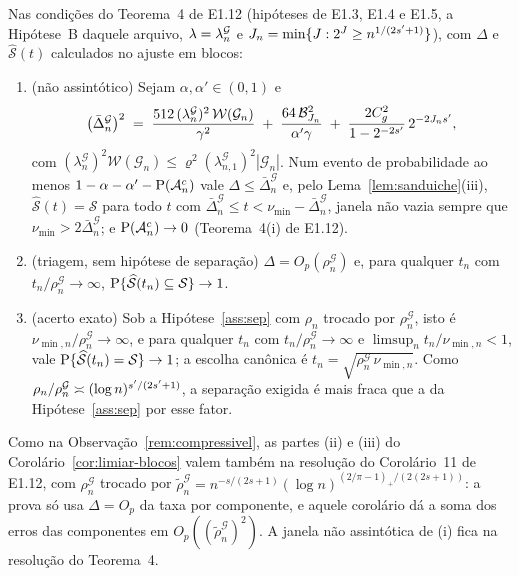 \documentclass[11pt,a4paper]{article}
\newcommand{\Shat}{\widehat{\mathcal{S}}}
\newcommand{\sepmin}{\nu_{\min}}
\newcommand{\sepminn}{\nu_{\min,n}}
\newcommand{\rn}{\rho}
\newcommand{\Gcal}{\mathcal{G}}
\newcommand{\lamG}{\lambda^{\mathcal{G}}_{n}}
\newcommand{\lamGone}{\lambda^{\mathcal{G}}_{n,1}}
\newcommand{\rhoG}{\rho^{\mathcal{G}}_{n}}
\newcommand{\rhoGt}{\tilde{\rho}^{\mathcal{G}}_{n}}
\newcommand{\Acal}{\mathcal{A}_{n}}
\begin{document}
\setcounter{corollary}{11}
\begin{corollary}\label{cor:limiar-blocos}
Nas condições do Teorema~4 de E1.12 (hipóteses de E1.3, E1.4 e E1.5, a
Hipótese~B daquele arquivo, $\pen = \lamG$ e $J_{n} = \min\{J : 2^{J} \ge
n^{1/(2s'+1)}\}$), com $\Delta$ e $\Shat(t)$ calculados no ajuste em
blocos:
\begin{enumerate}[label=\textup{(\roman*)}, leftmargin=*]
  \item \textup{(não assintótico)} Sejam $\alpha,\alpha' \in (0,1)$ e
    \begin{equation}
      \label{eq:Dn-blocos}
      \bigl(\bar\Delta_{n}^{\Gcal}\bigr)^{2}
      \;=\; \frac{512\,(\lamG)^{2}\,\mathcal{W}(\Gcal_{n})}{\gamma^{2}}
      \;+\; \frac{64\,\mathcal{B}_{J_{n}}^{2}}{\alpha'\gamma}
      \;+\; \frac{2C_{g}^{2}}{1-2^{-2\seff}}\,2^{-2J_{n}\seff},
    \end{equation}
    com $(\lamG)^{2}\mathcal{W}(\Gcal_{n}) \le \varrho^{2}(\lamGone)^{2}|\Gcal_{n}|$.
    Num evento de probabilidade ao menos $1 - \alpha - \alpha' -
    \Prob(\Acal^{c})$ vale $\Delta \le \bar\Delta_{n}^{\Gcal}$ e, pelo
    Lema~\ref{lem:sanduiche}(iii), $\Shat(t) = \mathcal{S}$ para todo $t$ com
    $\bar\Delta_{n}^{\Gcal} \le t < \sepmin - \bar\Delta_{n}^{\Gcal}$, janela
    não vazia sempre que $\sepmin > 2\bar\Delta_{n}^{\Gcal}$; e
    $\Prob(\Acal^{c}) \to 0$ (Teorema~4(i) de E1.12).
  \item \textup{(triagem, sem hipótese de separação)} $\Delta = O_{p}(\rhoG)$ e,
    para qualquer $t_{n}$ com $t_{n}/\rhoG \to \infty$,
    $\Prob\{\Shat(t_{n}) \subseteq \mathcal{S}\} \to 1$.
  \item \textup{(acerto exato)} Sob a Hipótese~\ref{ass:sep} com $\rn_{n}$
    trocado por $\rhoG$, isto é $\sepminn/\rhoG \to \infty$, e para qualquer
    $t_{n}$ com $t_{n}/\rhoG \to \infty$ e $\limsup_{n}t_{n}/\sepminn < 1$, vale
    $\Prob\{\Shat(t_{n}) = \mathcal{S}\} \to 1$; a escolha canônica é
    $t_{n} = \sqrt{\rhoG\,\sepminn}$. Como $\rn_{n}/\rhoG \asymp (\log
    n)^{\seff/(2\seff+1)}$, a separação exigida é mais fraca que a da
    Hipótese~\ref{ass:sep} por esse fator.
\end{enumerate}
\end{corollary}

\begin{remark}\label{rem:adaptativa-blocos}
Como na Observação~\ref{rem:compressivel}, as partes (ii) e (iii) do
Corolário~\ref{cor:limiar-blocos} valem também na resolução do Corolário~11 de
E1.12, com $\rhoG$ trocado por $\rhoGt = n^{-s/(2s+1)}(\log
n)^{(2/\pi-1)_{+}/(2(2s+1))}$: a prova só usa $\Delta = O_{p}$ da taxa por
componente, e aquele corolário dá a soma dos erros das componentes em
$O_{p}((\rhoGt)^{2})$. A janela não assintótica de (i) fica na resolução do
Teorema~4.
\end{remark}
\end{document}
